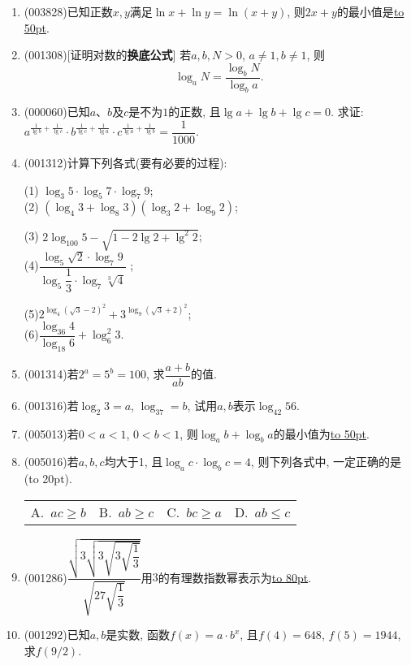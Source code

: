 \documentclass[10pt,a4paper]{article}
\newcommand{\blank}[1]{\underline{\hbox to #1pt{}}}
\newcommand{\bracket}[1]{(\hbox to #1pt{})}
\newcommand{\fourch}[4]{\par\begin{tabular}{p{.23\textwidth}p{.23\textwidth}p{.23\textwidth}p{.23\textwidth}}
A.~#1 &B.~#2& C.~#3& D.~#4
\end{tabular}}
\begin{document}
\begin{enumerate}[1.]
(2) 若$\log_3 2=a$, 则$\log_3 4=$\blank{80}, $\log_3 \dfrac{2}{3}=$\blank{80}.\\ 
(3) 若$\lg 2=a$, 则$\lg 25=$\blank{80}.
\item {\tiny (003828)}已知正数$x,y$满足$\ln x+\ln y=\ln (x+y)$, 则$2x+y$的最小值是\blank{50}.
\item {\tiny (001308)}[证明对数的{\bf 换底公式}]
若$a,b,N>0$, $a\ne 1, b\ne 1$, 则
$$\log_aN=\dfrac{\log_b N}{\log_b a}.$$
\item {\tiny (000060)}已知$a$、$b$及$c$是不为$1$的正数, 且$\lg a+\lg b+\lg c=0$. 求证: $a^{\frac{1}{\lg b}+\frac{1}{\lg c}}\cdot b^{\frac{1}{\lg c}+\frac{1}{\lg a}}\cdot c^{\frac{1}{\lg a}+\frac{1}{\lg b}}=\dfrac{1}{1000}$.
\item {\tiny (001312)}计算下列各式(要有必要的过程):\\ 
\begin{multicols}{2}
(1) $\log_3 5\cdot\log_5 7\cdot\log_7 9$; \\ 
(2) $(\log_4 3+\log_8 3)(\log_3 2+\log_9 2)$;\\ 
\end{multicols}
\begin{multicols}{2}
(3) $2\log_{100} 5-\sqrt{1-2\lg2+\lg^2 2}$; \\ 
(4)$\dfrac{\log_5 \sqrt{2}\cdot\log_7 9}{\log_5\dfrac{1}{3}\cdot\log_7\sqrt[3]{4}}$ ;
\end{multicols}
\begin{multicols}{2}
(5)$2^{\log_4(\sqrt{3}-2)^2}+3^{\log_9(\sqrt{3}+2)^2}$;  \\ 
(6)$\dfrac{\log_{36}4}{\log_{18}6}+\log_6^2 3$.\\ 
\end{multicols}
\item {\tiny (001314)}若$2^a=5^b=100$, 求$\dfrac{a+b}{ab}$的值.
\item {\tiny (001316)}若$\log_2 3=a$, $\log_37=b$, 试用$a,b$表示$\log_{42} 56$.
\item {\tiny (005013)}若$0<a<1$, $0<b<1$, 则$\log_ab+\log_ba$的最小值为\blank{50}.
\item {\tiny (005016)}若$a,b,c$均大于1, 且$\log_ac\cdot \log_bc=4$, 则下列各式中, 一定正确的是\bracket{20}.
\fourch{$ac\ge b$}{$ab\ge c$}{$bc\ge a$}{$ab\le c$}
\item {\tiny (001286)}$\dfrac{\sqrt{3\sqrt{3\sqrt{3\sqrt{\dfrac{1}{3}}}}}}{\sqrt{27\sqrt{\dfrac{1}{3}}}}$用$3$的有理数指数幂表示为\blank{80}.
\item {\tiny (001292)}已知$a,b$是实数, 函数$f(x)=a\cdot b^x$, 且$f(4)=648$, $f(5)=1944$, 求$f(9/2)$.

\end{enumerate}
\end{document}
